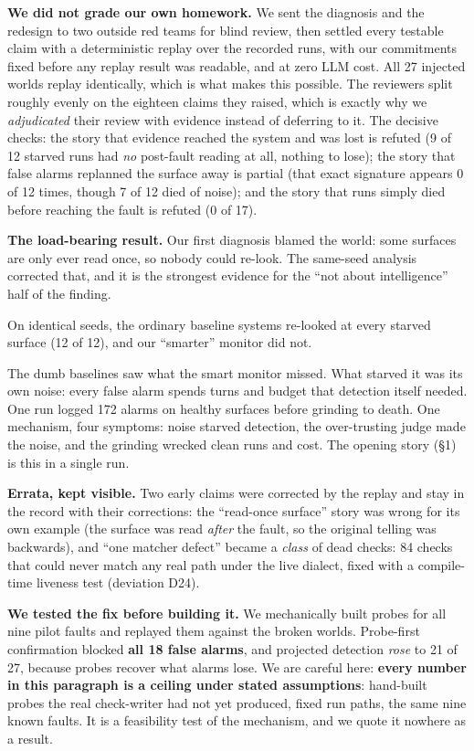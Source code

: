 \documentclass[acmsmall,screen]{acmart}
\begin{document}
\textbf{We did not grade our own homework.} We sent the diagnosis and the
redesign to two outside red teams for blind review, then settled every testable
claim with a deterministic replay over the recorded runs, with our commitments
fixed before any replay result was readable, and at zero LLM cost. All 27
injected worlds replay identically, which is what makes this possible. The
reviewers split roughly evenly on the eighteen claims they raised, which is
exactly why we \emph{adjudicated} their review with evidence instead of
deferring to it. The decisive checks: the story that evidence reached the system
and was lost is refuted (9 of 12 starved runs had \emph{no} post-fault reading
at all, nothing to lose); the story that false alarms replanned the surface
away is partial (that exact signature appears 0 of 12 times, though 7 of 12 died
of noise); and the story that runs simply died before reaching the fault is
refuted (0 of 17).

\textbf{The load-bearing result.} Our first diagnosis blamed the world: some
surfaces are only ever read once, so nobody could re-look. The same-seed
analysis corrected that, and it is the strongest evidence for the ``not about
intelligence'' half of the finding.

On identical seeds, the ordinary baseline systems re-looked at every starved
surface (12 of 12), and our ``smarter'' monitor did not.

The dumb baselines saw what the smart monitor missed. What starved it was its
own noise: every false alarm spends turns and budget that detection itself
needed. One run logged 172 alarms on healthy surfaces before grinding to death.
One mechanism, four symptoms: noise starved detection, the over-trusting judge
made the noise, and the grinding wrecked clean runs and cost. The opening story
(\S1) is this in a single run.

\textbf{Errata, kept visible.} Two early claims were corrected by the replay and
stay in the record with their corrections: the ``read-once surface'' story was
wrong for its own example (the surface was read \emph{after} the fault, so the
original telling was backwards), and ``one matcher defect'' became a \emph{class}
of dead checks: 84 checks that could never match any real path under the live
dialect, fixed with a compile-time liveness test (deviation D24).

\textbf{We tested the fix before building it.} We mechanically built probes for
all nine pilot faults and replayed them against the broken worlds. Probe-first
confirmation blocked \textbf{all 18 false alarms}, and projected detection
\emph{rose} to 21 of 27, because probes recover what alarms lose. We are careful
here: \textbf{every number in this paragraph is a ceiling under stated
assumptions}: hand-built probes the real check-writer had not yet produced,
fixed run paths, the same nine known faults. It is a feasibility test of the
mechanism, and we quote it nowhere as a result.
\end{document}
